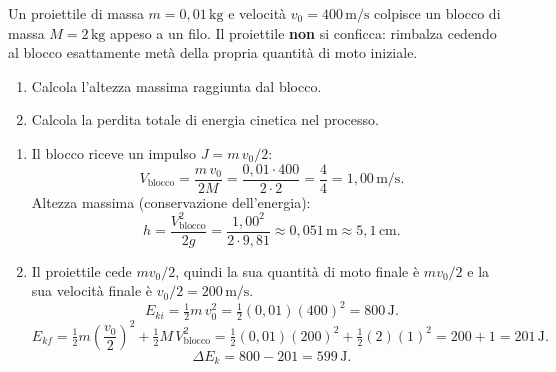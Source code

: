 \begin{question}[ID=5.5, subtitle={Altezza e perdita energetica con rimbalzo parziale}, tags={pendolo balistico, angolo massimo, urto parziale}, difficulty=difficile]
Un proiettile di massa \(m = 0{,}01 \, \text{kg}\) e velocità \(v_0 = 400 \, \text{m/s}\) colpisce un blocco di massa \(M = 2 \, \text{kg}\) appeso a un filo. Il proiettile \textbf{non} si conficca: rimbalza cedendo al blocco esattamente metà della propria quantità di moto iniziale.
\begin{enumerate}
    \item Calcola l'altezza massima raggiunta dal blocco.
    \item Calcola la perdita totale di energia cinetica nel processo.
\end{enumerate}
\begin{solution}
    \begin{enumerate}
        \item Il blocco riceve un impulso \(J = m\,v_0/2\):
        \[
            V_{\text{blocco}} = \frac{m\,v_0}{2M} = \frac{0{,}01 \cdot 400}{2 \cdot 2} = \frac{4}{4} = 1{,}00 \, \text{m/s}.
        \]
        Altezza massima (conservazione dell'energia):
        \[
            h = \frac{V_{\text{blocco}}^2}{2g} = \frac{1{,}00^2}{2 \cdot 9{,}81} \approx 0{,}051 \, \text{m} \approx 5{,}1 \, \text{cm}.
        \]
        \item Il proiettile cede \(mv_0/2\), quindi la sua quantità di moto finale è \(mv_0/2\) e la sua velocità finale è \(v_0/2 = 200 \, \text{m/s}\).
        \[
            E_{ki} = \tfrac{1}{2}m\,v_0^2 = \tfrac{1}{2}(0{,}01)(400)^2 = 800 \, \text{J}.
        \]
        \[
            E_{kf} = \tfrac{1}{2}m\!\left(\frac{v_0}{2}\right)^{\!2} + \tfrac{1}{2}M\,V_{\text{blocco}}^2
            = \tfrac{1}{2}(0{,}01)(200)^2 + \tfrac{1}{2}(2)(1)^2
            = 200 + 1 = 201 \, \text{J}.
        \]
        \[
            \Delta E_k = 800 - 201 = 599 \, \text{J}.
        \]
    \end{enumerate}
\end{solution}
\end{question}


